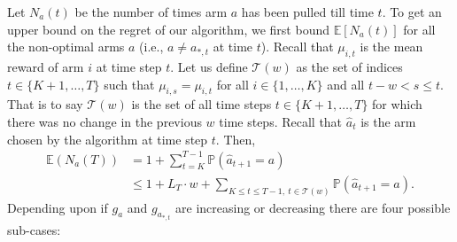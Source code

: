 \documentclass[letterpaper]{article} %
\newcommand{\bP}{\mathds{P}}
\newcommand{\ArmAt}{\hat{a}}
\newcommand{\IsEqual}{=}
\newcommand{\optArm}[1]{a_{*, #1}}
\newcommand{\noChange}{\mathcal{T}}
\newcommand{\meanReward}[2]{\mu_{#1, #2}}
\newcommand{\numChanges}{L}
\newcommand{\windowsize}{w}
\begin{document}
Let $N_a(t)$ be the number of times arm $a$ has been pulled till time $t$.
To get an upper bound on the regret of our algorithm, we first bound $\mathds{E}[N_a(t)]$ for all the non-optimal arms $a$ (i.e., $a \neq \optArm{t}$ at time $t$). Recall that $\meanReward{i}{t}$ is the mean reward of arm $i$ at time step $t$. Let us define $\noChange(\windowsize)$ as the set of indices $t \in \{K+1, \dots, T\}$ such that $\meanReward{i}{s} = \meanReward{i}{t}$ for all $ i \in \{1, \dots, K\}$ and all $t - \windowsize < s \leq t$. That is to say $\noChange(\windowsize)$ is the set of all time steps $t \in \{K+1, \dots, T\}$ for which there was no change in the previous $\windowsize$ time steps. 
Recall that $\ArmAt_{t}$ is the arm chosen by the algorithm at time step $t$. Then, 
\begin{align*}
\mathds{E}(N_a(T)) &= 1 + \sum_{t = K}^{T-1}\mathds{P}(\ArmAt_{t+1} \IsEqual a) \\
&\leq 1 + \numChanges_T \cdot \windowsize  + \sum_{K \leq t \leq T-1, \ t \in \noChange(\windowsize)} 
\bP(\ArmAt_{t+1} = a).
\end{align*}
Depending upon if $g_a$ and $g_{\optArm{t}}$ are increasing or decreasing there are four possible sub-cases:
\end{document}
